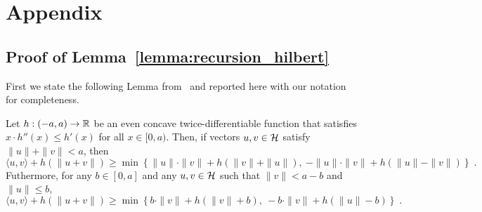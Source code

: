 \section{Appendix}

\subsection{Proof of Lemma~\ref{lemma:recursion_hilbert}}

First we state the following Lemma from~\cite{McMahanO14} and reported here with our notation for completeness.
\begin{lemma}[Extremes]
\label{lemma:extremes}
Let $h:(-a,a) \to \mathbb{R}$ be an even concave twice-differentiable function that
satisfies $x \cdot h''(x) \le h'(x)$ for all $x \in [0,a)$. Then, if vectors
$u,v \in \mathcal{H}$ satisfy $\|u\| + \|v\| < a$, then
\begin{equation}
\label{equation:lemma-extremes-1}
\langle u, v \rangle + h(\|u + v\|) \ge \min \left\{ \|u\| \cdot \|v\| + h(\|v\| + \|u\|), \ - \|u\| \cdot \|v\| + h(\|u\| - \|v\|) \right\} \; .
\end{equation}
Futhermore, for any $b \in [0,a]$ and any $u, v \in \mathcal{H}$ such that $\|v\| < a - b$ and $\|u\| \le b$,
\begin{equation}
\label{equation:lemma-extremes-2}
\langle u, v \rangle + h(\|u + v\|) \ge \min \left\{ b \cdot \|v\| + h(\|v\| + b), \ - b \cdot \|v\| + h(\|u\| - b) \right\} \; .
\end{equation}
\end{lemma}
%
